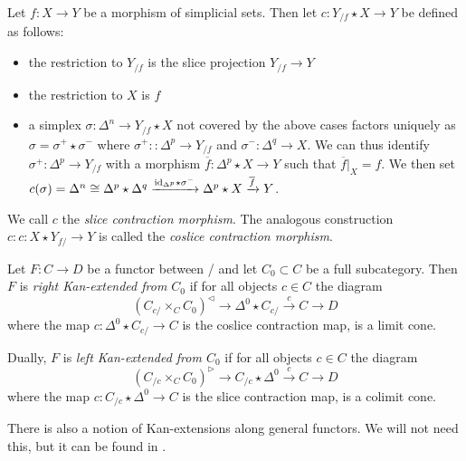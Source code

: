 \begin{construction}%
    Let $f\colon X\to Y$ be a morphism of simplicial sets.
    Then let $c\colon Y_{/f}\star X\to Y$ be defined as follows:
    \begin{itemize}
        \item the restriction to $Y_{/f}$ is the slice projection $Y_{/f}\to Y$
        \item the restriction to $X$ is $f$
        \item a simplex $\sigma\colon\Delta^n\to Y_{/f}\star X$ not covered by the above cases factors uniquely as $\sigma=\sigma^+\star\sigma^-$ where $\sigma^+\colon\colon\Delta^p\to Y_{/f}$ and $\sigma^-\colon\Delta^q\to X$.
              We can thus identify $\sigma^+\colon\Delta^p\to Y_{/f}$ with a morphism $\overline{f}\colon\Delta^p\star X\to Y$ such that $\overline{f}|_{X}=f$.
              We then set $c(\sigma)=\Delta^n\cong\Delta^p\star\Delta^q\xrightarrow{\text{id}_{\Delta^p}\star\sigma^-}\Delta^p\star X\xrightarrow{\overline{f}} Y$.
    \end{itemize}
    We call $c$ the \emph{slice contraction morphism}.
    The analogous construction $c\colon c\colon X\star Y_{f/}\to Y$ is called the \emph{coslice contraction morphism}.
\end{construction}
\begin{definition} %
    Let $F\colon C\to D$ be a functor between \inftycats/ and let $C_0\subset C$ be a full subcategory.
    Then $F$ is \emph{right Kan-extended from $C_0$} if for all objects $c\in C$ the diagram
    \begin{equation*}
        \left(C_{c/}\times_C C_0\right)^{\lhd}\to \Delta^0\star C_{c/}\xrightarrow{c} C\to D
    \end{equation*}
    where the map $c\colon\Delta^0\star C_{c/}\to C$ is the coslice contraction map, is a limit cone.

    Dually, $F$ is \emph{left Kan-extended from $C_0$} if for all objects $c\in C$ the diagram
    \begin{equation*}
        \left(C_{/c}\times_C C_0\right)^{\rhd}\to C_{/c}\star\Delta^0 \xrightarrow{c} C\to D
    \end{equation*}
    where the map $c\colon C_{/c}\star\Delta^0\to C$ is the slice contraction map, is a colimit cone.
\end{definition}
\begin{remark}
    There is also a notion of Kan-extensions along general functors. 
    We will not need this, but it can be found in \cite[\S 7.3.1]{kerodon}.
\end{remark}
